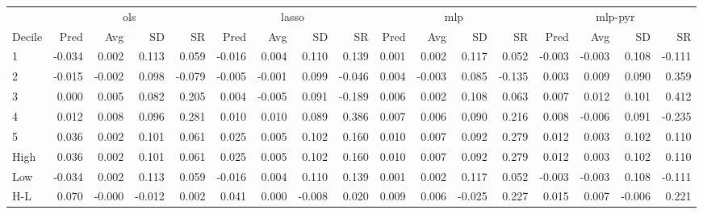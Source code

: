 \begin{tabular}{lrrrrrrrrrrrrrrrr}
\toprule
    & \multicolumn{4}{c}{ols} & \multicolumn{4}{c}{lasso} & \multicolumn{4}{c}{mlp} & \multicolumn{4}{c}{mlp-pyr} \\
     \cmidrule(lr){2-5} \cmidrule(lr){6-9} \cmidrule(lr){10-13} \cmidrule(lr){14-17}
Decile & Pred & Avg & SD & SR & Pred & Avg & SD & SR & Pred & Avg & SD & SR & Pred & Avg & SD & SR \\
\midrule
1 & -0.034 & 0.002 & 0.113 & 0.059 & -0.016 & 0.004 & 0.110 & 0.139 & 0.001 & 0.002 & 0.117 & 0.052 & -0.003 & -0.003 & 0.108 & -0.111 \\
2 & -0.015 & -0.002 & 0.098 & -0.079 & -0.005 & -0.001 & 0.099 & -0.046 & 0.004 & -0.003 & 0.085 & -0.135 & 0.003 & 0.009 & 0.090 & 0.359 \\
3 & 0.000 & 0.005 & 0.082 & 0.205 & 0.004 & -0.005 & 0.091 & -0.189 & 0.006 & 0.002 & 0.108 & 0.063 & 0.007 & 0.012 & 0.101 & 0.412 \\
4 & 0.012 & 0.008 & 0.096 & 0.281 & 0.010 & 0.010 & 0.089 & 0.386 & 0.007 & 0.006 & 0.090 & 0.216 & 0.008 & -0.006 & 0.091 & -0.235 \\
5 & 0.036 & 0.002 & 0.101 & 0.061 & 0.025 & 0.005 & 0.102 & 0.160 & 0.010 & 0.007 & 0.092 & 0.279 & 0.012 & 0.003 & 0.102 & 0.110 \\
High & 0.036 & 0.002 & 0.101 & 0.061 & 0.025 & 0.005 & 0.102 & 0.160 & 0.010 & 0.007 & 0.092 & 0.279 & 0.012 & 0.003 & 0.102 & 0.110 \\
Low & -0.034 & 0.002 & 0.113 & 0.059 & -0.016 & 0.004 & 0.110 & 0.139 & 0.001 & 0.002 & 0.117 & 0.052 & -0.003 & -0.003 & 0.108 & -0.111 \\
H-L & 0.070 & -0.000 & -0.012 & 0.002 & 0.041 & 0.000 & -0.008 & 0.020 & 0.009 & 0.006 & -0.025 & 0.227 & 0.015 & 0.007 & -0.006 & 0.221 \\
\bottomrule
\end{tabular}